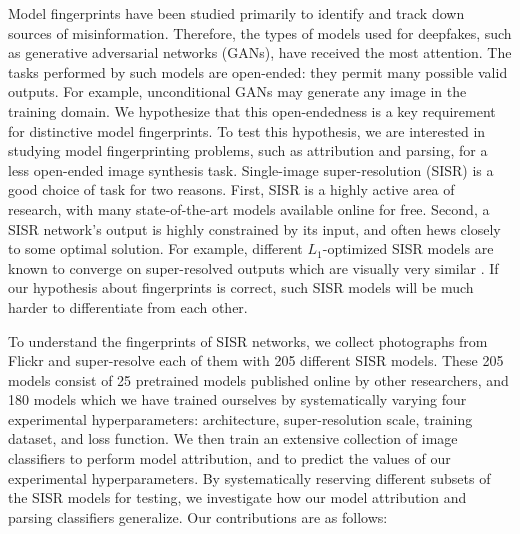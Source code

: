 \documentclass[10pt]{article} %
\begin{document}
Model fingerprints have been studied primarily to identify and track down sources of misinformation. Therefore, the types of models used for deepfakes, such as generative adversarial networks (GANs), have received the most attention. The tasks performed by such models are open-ended: they permit many possible valid outputs. For example, unconditional GANs may generate any image in the training domain. We hypothesize that this open-endedness is a key requirement for distinctive model fingerprints. To test this hypothesis, we are interested in studying model fingerprinting problems, such as attribution and parsing, for a less open-ended image synthesis task. Single-image super-resolution (SISR) is a good choice of task for two reasons. First, SISR is a highly active area of research, with many state-of-the-art models available online for free. Second, a SISR network's output is highly constrained by its input, and often hews closely to some optimal solution. For example, different $L_1$-optimized SISR models are known to converge on super-resolved outputs which are visually very similar \citep{sajjadi2016enhancenet}. If our hypothesis about fingerprints is correct, such SISR models will be much harder to differentiate from each other.

To understand the fingerprints of SISR networks, we collect photographs from Flickr and super-resolve each of them with 205 different SISR models. These 205 models consist of 25 pretrained models published online by other researchers, and 180 models which we have trained ourselves by systematically varying four experimental hyperparameters: architecture, super-resolution scale, training dataset, and loss function. We then train an extensive collection of image classifiers to perform model attribution, and to predict the values of our experimental hyperparameters. By systematically reserving different subsets of the SISR models for testing, we investigate how our model attribution and parsing classifiers generalize. Our contributions are as follows:
\end{document}
